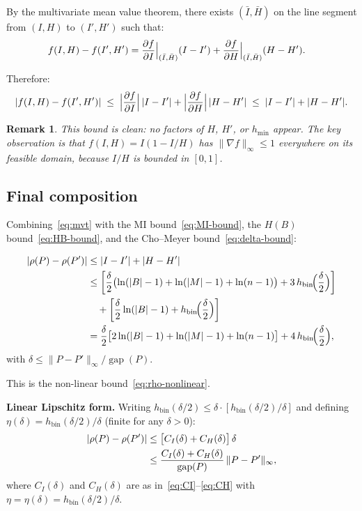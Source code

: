 \documentclass[11pt]{article}
\newtheorem{remark}[theorem]{Remark}
\DeclareMathOperator{\gap}{gap}
\begin{document}
By the multivariate mean value theorem, there exists
$(\bar{I},\bar{H})$ on the line segment from $(I,H)$ to $(I',H')$
such that:
\begin{align}
  f(I,H) - f(I',H') &= \frac{\partial f}{\partial I}\Big|_{(\bar{I},\bar{H})}
  (I - I') + \frac{\partial f}{\partial H}\Big|_{(\bar{I},\bar{H})}(H - H'). \notag
\end{align}

Therefore:
\begin{equation}\label{eq:mvt}
  |f(I,H) - f(I',H')|
  \;\le\; \Bigl|\frac{\partial f}{\partial I}\Bigr|\,|I - I'|
  + \Bigl|\frac{\partial f}{\partial H}\Bigr|\,|H - H'|
  \;\le\; |I - I'| + |H - H'|.
\end{equation}

\begin{remark}
This bound is clean: no factors of $H$, $H'$, or $h_{\min}$ appear.
The key observation is that $f(I,H) = I(1-I/H)$ has
$\|\nabla f\|_\infty \le 1$ everywhere on its feasible domain,
because $I/H$ is bounded in $[0,1]$.
\end{remark}

\subsection{Final composition}

Combining~\eqref{eq:mvt} with the MI bound~\eqref{eq:MI-bound},
the $H(B)$ bound~\eqref{eq:HB-bound}, and the Cho--Meyer
bound~\eqref{eq:delta-bound}:

\begin{align}
  |\rho(P) - \rho(P')|
  &\le |I - I'| + |H - H'| \notag\\
  &\le \biggl[\frac{\delta}{2}\bigl(\ln(|B|-1) + \ln(|M|-1) + \ln(n-1)\bigr)
       + 3\,h_{\mathrm{bin}}\!\Bigl(\frac{\delta}{2}\Bigr)\biggr] \notag\\
  &\quad + \biggl[\frac{\delta}{2}\ln(|B|-1)
       + h_{\mathrm{bin}}\!\Bigl(\frac{\delta}{2}\Bigr)\biggr] \notag\\
  &= \frac{\delta}{2}\bigl[2\ln(|B|-1) + \ln(|M|-1) + \ln(n-1)\bigr]
     + 4\,h_{\mathrm{bin}}\!\Bigl(\frac{\delta}{2}\Bigr), \label{eq:rho-bound-nonlinear}
\end{align}
with $\delta \le \|P - P'\|_\infty / \gap(P)$.

This is the non-linear bound~\eqref{eq:rho-nonlinear}.

\medskip
\textbf{Linear Lipschitz form.}  Writing
$h_{\mathrm{bin}}(\delta/2) \le \delta \cdot [h_{\mathrm{bin}}(\delta/2)/\delta]$
and defining $\eta(\delta) = h_{\mathrm{bin}}(\delta/2)/\delta$ (finite for
any $\delta > 0$):
\begin{align}
  |\rho(P) - \rho(P')|
  &\le \bigl[C_I(\delta) + C_H(\delta)\bigr]\,\delta \notag\\
  &\le \frac{C_I(\delta) + C_H(\delta)}{\gap(P)}\,\|P - P'\|_\infty,
  \label{eq:rho-bound-linear}
\end{align}
where $C_I(\delta)$ and $C_H(\delta)$ are as in~\eqref{eq:CI}--\eqref{eq:CH}
with $\eta = \eta(\delta) = h_{\mathrm{bin}}(\delta/2)/\delta$.
\end{document}
